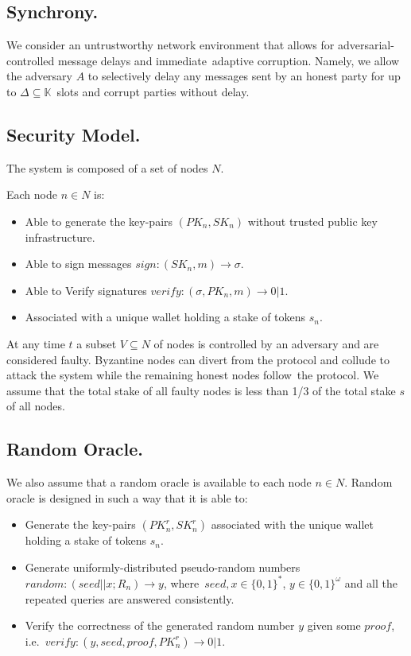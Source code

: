 \subsection{Synchrony.}\label{subsec:synchrony.}
We consider an untrustworthy network environment that allows for adversarial-controlled message delays and immediate\
adaptive corruption.
Namely, we allow the adversary $A$ to selectively delay any messages sent by an honest party for up to $\Delta \subseteq \mathbb{K}$\
slots and corrupt parties without delay.

\subsection{Security Model.}\label{subsec:security-model.}
The system is composed of a set of nodes $N$.

Each node $n \in N$ is:
\begin{itemize}
    \item Able to generate the key-pairs ${(PK_n, SK_n)}$ without trusted public key infrastructure.
    \item Able to sign messages ${sign: (SK_n, m) \rightarrow \sigma}$.
    \item Able to Verify signatures ${verify: (\sigma, PK_n, m) \rightarrow 0 | 1}$.
    \item Associated with a unique wallet holding a stake of tokens $s_n$.
\end{itemize}

At any time $t$ a subset ${V \subseteq N}$ of nodes is controlled by an adversary and are considered faulty.
Byzantine nodes can divert from the protocol and collude to attack the system while the remaining honest nodes follow\
the protocol.
We assume that the total stake of all faulty nodes is less than 1/3 of the total stake $s$ of all nodes.

\subsection{Random Oracle.}\label{subsec:random-oracle.}
We also assume that a random oracle is available to each node $n \in N$.
Random oracle is designed in such a way that it is able to:
\begin{itemize}
    \item Generate the key-pairs ${(PK^r_n, SK^r_n)}$ associated with the unique wallet holding a stake of tokens $s_n$.
    \item Generate uniformly-distributed pseudo-random numbers ${random: (seed || x; R_n) \rightarrow y}$, where\
    ${seed, x \in \{0,1\}^*}$, ${y \in \{0,1\}^\omega}$ and all the repeated queries are answered consistently.
    \item Verify the correctness of the generated random number $y$ given some $proof$, i.e.\
    ${verify: (y, seed, proof, PK^r_n) \rightarrow 0 | 1}$.
\end{itemize}

